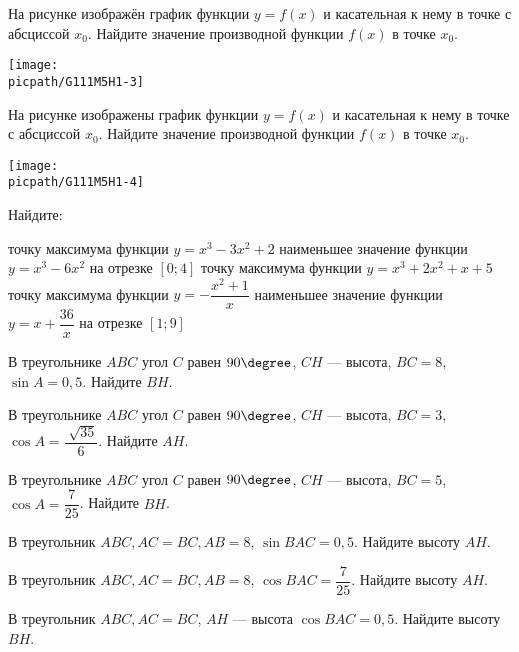 \begin{homework}[number=1]
\begin{listofex}
		\begin{minipage}[t]{\bodywidth}
			На рисунке изображён график функции \(y=f(x)\) и касательная к нему в точке с абсциссой \(x_0\). Найдите значение производной функции \(f(x)\) в точке \(x_0\).
		\end{minipage}
		\hspace{0.02\linewidth}
		\begin{minipage}[t]{\picwidth}
			\texttt{[image: \\picpath/G111M5H1-3]}
		\end{minipage}
		\item
		\begin{minipage}[t]{\bodywidth}
			На рисунке изображены график функции \(y = f(x)\) и касательная к нему в точке с абсциссой \(x_0\). Найдите значение производной функции \(f(x)\) в точке \(x_0\).
		\end{minipage}
		\hspace{0.02\linewidth}
		\begin{minipage}[t]{\picwidth}
			\texttt{[image: \\picpath/G111M5H1-4]}
		\end{minipage}
		\item Найдите:
		\begin{itasks}[1]
			\task точку максимума функции \(y = x^3 - 3x^2 + 2\)
			\task наименьшее значение функции \(y = x^3 - 6x^2\) на отрезке \([0;4]\)
			\task точку максимума функции \(y = x^3 + 2x^2 + x + 5\)
			\task точку максимума функции \(y = -\dfrac{x^2+1}{x}\)
			\task наименьшее значение функции \(y = x + \dfrac{36}{x}\) на отрезке \([1;9]\)
		\end{itasks}
	\end{listofex}
\end{homework}

\begin{homework}[number=2]
	\begin{listofex}
		\item В треугольнике \(ABC\) угол \(C\) равен \(90 \degree \), \(CH\) --- высота, \(BC = 8\), \(\sin{A} = 0,5\). Найдите \(BH\).
		\item В треугольнике \(ABC\) угол \(C\) равен \(90 \degree \), \(CH\) --- высота, \(BC=3\), \(\cos{A} = \dfrac{\sqrt[]{35}}{6}\). Найдите \(AH\).
		\item В треугольнике \(ABC\) угол \(C\) равен \(90 \degree \), \(CH\) --- высота, \(BC=5\), \(\cos{A} = \dfrac{7}{25}\). Найдите \(BH\).
		\item В треугольник \(ABC, AC = BC, AB = 8\), \( \sin{BAC}= 0,5 \). Найдите высоту \(AH\).
		\item В треугольник \(ABC, AC = BC, AB = 8\), \( \cos{BAC}= \dfrac{7}{25} \). Найдите высоту \(AH\).
		\item В треугольник \(ABC, AC = BC\), \(AH\) --- высота \( \cos{BAC}= 0,5 \). Найдите высоту \(BH\).
	\end{listofex}
\end{homework}

